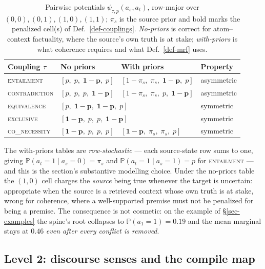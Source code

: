 \documentclass{article} %
\newcommand{\pr}[1]{\mathbb{P}\!\left( #1 \right)}
\newcommand{\coupling}[1]{\textsc{#1}}          %
\begin{document}
\begin{table}[t]
\centering\small
\caption{Pairwise potentials $\psi_{\tau,p}(a_s,a_t)$, row-major over
  $(0,0),(0,1),(1,0),(1,1)$; $\pi_s$ is the source prior and bold marks the penalized cell(s)
  of Def.~\ref{def-couplings}. \emph{No-priors} is correct for atom--context factuality, where
  the source's own truth is at stake; \emph{with-priors} is what coherence requires and what
  Def.~\ref{def-mrf} uses.}
\label{tab:factors}
\begin{tabular}{@{}llll@{}}
\toprule
Coupling $\tau$ & No priors & With priors & Property \\
\midrule
\coupling{entailment}    & $[p,\;p,\;\mathbf{1\!-\!p},\;p]$
                         & $[1\!-\!\pi_s,\;\pi_s,\;\mathbf{1\!-\!p},\;p]$
                         & asymmetric \\
\coupling{contradiction} & $[p,\;p,\;p,\;\mathbf{1\!-\!p}]$
                         & $[1\!-\!\pi_s,\;\pi_s,\;p,\;\mathbf{1\!-\!p}]$
                         & asymmetric \\
\coupling{equivalence}   & \multicolumn{2}{l}{$[p,\;\mathbf{1\!-\!p},\;\mathbf{1\!-\!p},\;p]$}
                         & symmetric \\
\coupling{exclusive}     & \multicolumn{2}{l}{$[\mathbf{1\!-\!p},\;p,\;p,\;\mathbf{1\!-\!p}]$}
                         & symmetric \\
\coupling{co\_necessity} & $[\mathbf{1\!-\!p},\;p,\;p,\;p]$
                         & $[\mathbf{1\!-\!p},\;\pi_s,\;\pi_s,\;p]$
                         & symmetric \\
\bottomrule
\end{tabular}
\end{table}

The with-priors tables are \emph{row-stochastic} --- each source-state row sums to one, giving
$\pr{a_t{=}1\mid a_s{=}0}=\pi_s$ and $\pr{a_t{=}1\mid a_s{=}1}=p$ for \coupling{entailment} ---
and this is the section's substantive modelling choice. Under the no-priors table the $(1,0)$ cell
charges the \emph{source} being true whenever the target is uncertain: appropriate when the source
is a retrieved context whose own truth is at stake, wrong for coherence, where a well-supported
premise must not be penalized for being a premise. The consequence is not cosmetic: on the example
of \S\ref{sec-examples} the spine's root collapses to $\pr{a_1{=}1}=0.19$ and the mean marginal
stays at $0.46$ \emph{even after every conflict is removed}.

\subsection{Level 2: discourse senses and the compile map}
\end{document}
